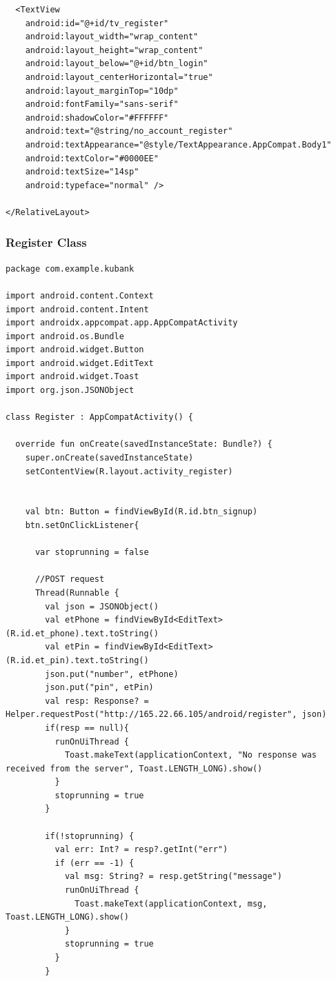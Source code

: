\documentclass[11pt, a4paper]{article}
\begin{document}
\begin{appendices}
\begin{lstlisting}
  <TextView
    android:id="@+id/tv_register"
    android:layout_width="wrap_content"
    android:layout_height="wrap_content"
    android:layout_below="@+id/btn_login"
    android:layout_centerHorizontal="true"
    android:layout_marginTop="10dp"
    android:fontFamily="sans-serif"
    android:shadowColor="#FFFFFF"
    android:text="@string/no_account_register"
    android:textAppearance="@style/TextAppearance.AppCompat.Body1"
    android:textColor="#0000EE"
    android:textSize="14sp"
    android:typeface="normal" />

</RelativeLayout>
\end{lstlisting}
\subsubsection{Register Class}
\begin{lstlisting}
package com.example.kubank

import android.content.Context
import android.content.Intent
import androidx.appcompat.app.AppCompatActivity
import android.os.Bundle
import android.widget.Button
import android.widget.EditText
import android.widget.Toast
import org.json.JSONObject

class Register : AppCompatActivity() {

  override fun onCreate(savedInstanceState: Bundle?) {
    super.onCreate(savedInstanceState)
    setContentView(R.layout.activity_register)


    val btn: Button = findViewById(R.id.btn_signup)
    btn.setOnClickListener{

      var stoprunning = false

      //POST request
      Thread(Runnable {
        val json = JSONObject()
        val etPhone = findViewById<EditText>(R.id.et_phone).text.toString()
        val etPin = findViewById<EditText>(R.id.et_pin).text.toString()
        json.put("number", etPhone)
        json.put("pin", etPin)
        val resp: Response? = Helper.requestPost("http://165.22.66.105/android/register", json)
        if(resp == null){
          runOnUiThread {
            Toast.makeText(applicationContext, "No response was received from the server", Toast.LENGTH_LONG).show()
          }
          stoprunning = true
        }

        if(!stoprunning) {
          val err: Int? = resp?.getInt("err")
          if (err == -1) {
            val msg: String? = resp.getString("message")
            runOnUiThread {
              Toast.makeText(applicationContext, msg, Toast.LENGTH_LONG).show()
            }
            stoprunning = true
          }
        }


\end{lstlisting}
\end{appendices}
\end{document}
